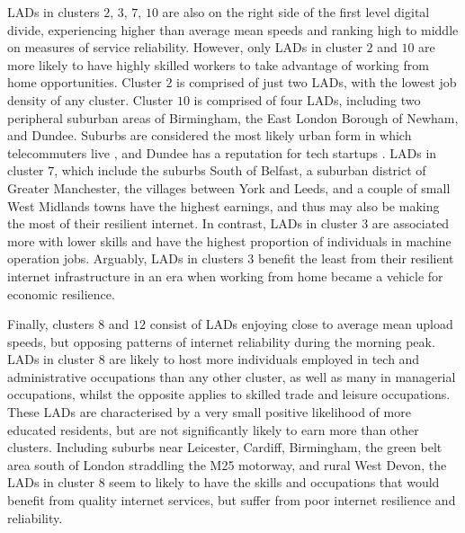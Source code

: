 \documentclass[Royal,times,sageh]{sagej}
\begin{document}
LADs in clusters \(2\), \(3\), \(7\), \(10\) are also on the right side
of the first level digital divide, experiencing higher than average mean
speeds and ranking high to middle on measures of service reliability.
However, only LADs in cluster \(2\) and \(10\) are more likely to have
highly skilled workers to take advantage of working from home
opportunities. Cluster \(2\) is comprised of just two LADs, with the
lowest job density of any cluster. Cluster \(10\) is comprised of four
LADs, including two peripheral suburban areas of Birmingham, the East
London Borough of Newham, and Dundee. Suburbs are considered the most
likely urban form in which telecommuters live \citep{e2018does}, and
Dundee has a reputation for tech startups \citep{technation2017}. LADs
in cluster \(7\), which include the suburbs South of Belfast, a suburban
district of Greater Manchester, the villages between York and Leeds, and
a couple of small West Midlands towns have the highest earnings, and
thus may also be making the most of their resilient internet. In
contrast, LADs in cluster \(3\) are associated more with lower skills
and have the highest proportion of individuals in machine operation
jobs. Arguably, LADs in clusters \(3\) benefit the least from their
resilient internet infrastructure in an era when working from home
became a vehicle for economic resilience.

Finally, clusters \(8\) and \(12\) consist of LADs enjoying close to
average mean upload speeds, but opposing patterns of internet
reliability during the morning peak. LADs in cluster \(8\) are likely to
host more individuals employed in tech and administrative occupations
than any other cluster, as well as many in managerial occupations,
whilst the opposite applies to skilled trade and leisure occupations.
These LADs are characterised by a very small positive likelihood of more
educated residents, but are not significantly likely to earn more than
other clusters. Including suburbs near Leicester, Cardiff, Birmingham,
the green belt area south of London straddling the M25 motorway, and
rural West Devon, the LADs in cluster \(8\) seem to likely to have the
skills and occupations that would benefit from quality internet
services, but suffer from poor internet resilience and reliability.
\end{document}
